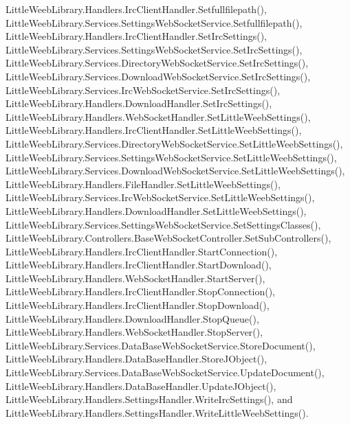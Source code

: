 Little\+Weeb\+Library.\+Handlers.\+Irc\+Client\+Handler.\+Setfullfilepath(), Little\+Weeb\+Library.\+Services.\+Settings\+Web\+Socket\+Service.\+Setfullfilepath(), Little\+Weeb\+Library.\+Handlers.\+Irc\+Client\+Handler.\+Set\+Irc\+Settings(), Little\+Weeb\+Library.\+Services.\+Settings\+Web\+Socket\+Service.\+Set\+Irc\+Settings(), Little\+Weeb\+Library.\+Services.\+Directory\+Web\+Socket\+Service.\+Set\+Irc\+Settings(), Little\+Weeb\+Library.\+Services.\+Download\+Web\+Socket\+Service.\+Set\+Irc\+Settings(), Little\+Weeb\+Library.\+Services.\+Irc\+Web\+Socket\+Service.\+Set\+Irc\+Settings(), Little\+Weeb\+Library.\+Handlers.\+Download\+Handler.\+Set\+Irc\+Settings(), Little\+Weeb\+Library.\+Handlers.\+Web\+Socket\+Handler.\+Set\+Little\+Weeb\+Settings(), Little\+Weeb\+Library.\+Handlers.\+Irc\+Client\+Handler.\+Set\+Little\+Weeb\+Settings(), Little\+Weeb\+Library.\+Services.\+Directory\+Web\+Socket\+Service.\+Set\+Little\+Weeb\+Settings(), Little\+Weeb\+Library.\+Services.\+Settings\+Web\+Socket\+Service.\+Set\+Little\+Weeb\+Settings(), Little\+Weeb\+Library.\+Services.\+Download\+Web\+Socket\+Service.\+Set\+Little\+Weeb\+Settings(), Little\+Weeb\+Library.\+Handlers.\+File\+Handler.\+Set\+Little\+Weeb\+Settings(), Little\+Weeb\+Library.\+Services.\+Irc\+Web\+Socket\+Service.\+Set\+Little\+Weeb\+Settings(), Little\+Weeb\+Library.\+Handlers.\+Download\+Handler.\+Set\+Little\+Weeb\+Settings(), Little\+Weeb\+Library.\+Services.\+Settings\+Web\+Socket\+Service.\+Set\+Settings\+Classes(), Little\+Weeb\+Library.\+Controllers.\+Base\+Web\+Socket\+Controller.\+Set\+Sub\+Controllers(), Little\+Weeb\+Library.\+Handlers.\+Irc\+Client\+Handler.\+Start\+Connection(), Little\+Weeb\+Library.\+Handlers.\+Irc\+Client\+Handler.\+Start\+Download(), Little\+Weeb\+Library.\+Handlers.\+Web\+Socket\+Handler.\+Start\+Server(), Little\+Weeb\+Library.\+Handlers.\+Irc\+Client\+Handler.\+Stop\+Connection(), Little\+Weeb\+Library.\+Handlers.\+Irc\+Client\+Handler.\+Stop\+Download(), Little\+Weeb\+Library.\+Handlers.\+Download\+Handler.\+Stop\+Queue(), Little\+Weeb\+Library.\+Handlers.\+Web\+Socket\+Handler.\+Stop\+Server(), Little\+Weeb\+Library.\+Services.\+Data\+Base\+Web\+Socket\+Service.\+Store\+Document(), Little\+Weeb\+Library.\+Handlers.\+Data\+Base\+Handler.\+Store\+J\+Object(), Little\+Weeb\+Library.\+Services.\+Data\+Base\+Web\+Socket\+Service.\+Update\+Document(), Little\+Weeb\+Library.\+Handlers.\+Data\+Base\+Handler.\+Update\+J\+Object(), Little\+Weeb\+Library.\+Handlers.\+Settings\+Handler.\+Write\+Irc\+Settings(), and Little\+Weeb\+Library.\+Handlers.\+Settings\+Handler.\+Write\+Little\+Weeb\+Settings().


